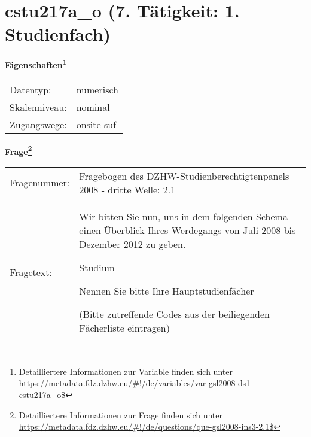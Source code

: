 
    \setcounter{footnote}{0}

    \vspace*{-1.8cm}
	\section{cstu217a\_o (7. Tätigkeit: 1. Studienfach)}
	\label{section:cstu217a_o}



    \vspace*{0.5cm}
    \noindent\textbf{Eigenschaften\footnote{Detailliertere Informationen zur Variable finden sich unter
		\url{https://metadata.fdz.dzhw.eu/\#!/de/variables/var-gsl2008-ds1-cstu217a_o$}}}\\
	\begin{tabularx}{\hsize}{@{}lX}
	Datentyp: & numerisch \\
	Skalenniveau: & nominal \\
	Zugangswege: &
	  onsite-suf
 \\
    \end{tabularx}



				\vspace*{0.5cm}
                \noindent\textbf{Frage\footnote{Detailliertere Informationen zur Frage finden sich unter
		              \url{https://metadata.fdz.dzhw.eu/\#!/de/questions/que-gsl2008-ins3-2.1$}}}\\
				\begin{tabularx}{\hsize}{@{}lX}
					Fragenummer: &
					  Fragebogen des DZHW-Studienberechtigtenpanels 2008 - dritte Welle:
					  2.1
 \\
					Fragetext: & Wir bitten Sie nun, uns in dem folgenden Schema einen Überblick Ihres Werdegangs von Juli 2008 bis Dezember 2012 zu geben.\par  Studium\par  Nennen Sie bitte Ihre Hauptstudienfächer\par  (Bitte zutreffende Codes aus der beiliegenden Fächerliste eintragen) \\
				\end{tabularx}





